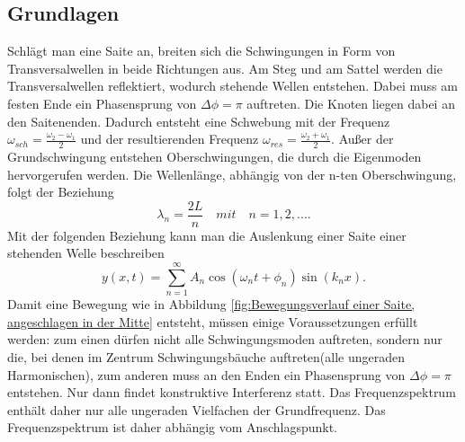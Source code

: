 \documentclass[a4paper, 11pt]{article}
\begin{document}
\subsection{Grundlagen}
Schlägt man eine Saite an, breiten sich die Schwingungen in Form von Transversalwellen in beide Richtungen aus. Am Steg und am Sattel werden die Transversalwellen reflektiert, wodurch stehende Wellen entstehen. Dabei muss am festen Ende ein Phasensprung von $\Delta \phi = \pi$ auftreten. Die Knoten liegen dabei an den Saitenenden. Dadurch entsteht eine Schwebung mit der Frequenz $\omega_{sch} = \frac{\omega_2 - \omega_1}{2}$ und der resultierenden Frequenz $\omega_{res} = \frac{\omega_2 + \omega_1}{2}$. Außer der Grundschwingung entstehen Oberschwingungen, die durch die Eigenmoden hervorgerufen werden. Die Wellenlänge, abhängig von der n-ten Oberschwingung, folgt der Beziehung
\begin{equation}
\lambda_n = \frac{2L}{n} \quad mit \quad  n = 1,2,... .
\end{equation}
Mit der folgenden Beziehung kann man die Auslenkung einer Saite einer stehenden Welle beschreiben
\begin{equation}
y(x,t) = \sum_{n=1}^{\infty} A_n\cos(\omega_nt+\phi_n)\sin(k_nx).
\end{equation}
Damit eine Bewegung wie in Abbildung \ref{fig:Bewegungsverlauf einer Saite, angeschlagen in der Mitte} entsteht, müssen einige Voraussetzungen erfüllt werden: zum einen dürfen nicht alle Schwingungsmoden auftreten, sondern nur die, bei denen im Zentrum Schwingungsbäuche auftreten(alle ungeraden Harmonischen), zum anderen muss an den Enden ein Phasensprung von $\Delta \phi = \pi$ entstehen. Nur dann findet konstruktive Interferenz statt. Das Frequenzspektrum enthält daher nur alle ungeraden Vielfachen der Grundfrequenz. Das Frequenzspektrum ist daher abhängig vom Anschlagspunkt.
\end{document}
